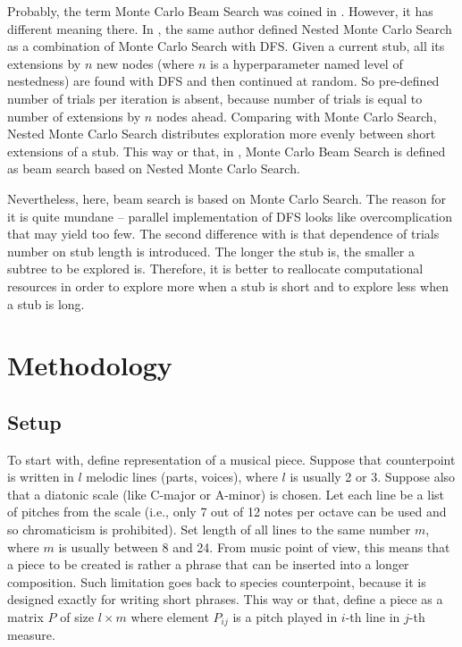 \documentclass{article}
\begin{document}
Probably, the term Monte Carlo Beam Search was coined in \cite{cazenave2012beam}. However, it has different meaning there. In \cite{cazenave2009nested}, the same author defined Nested Monte Carlo Search as a combination of Monte Carlo Search with DFS. Given a current stub, all its extensions by $n$ new nodes (where $n$ is a hyperparameter named level of nestedness) are found with DFS and then continued at random. So pre-defined number of trials per iteration is absent, because number of trials is equal to number of extensions by $n$ nodes ahead. Comparing with Monte Carlo Search, Nested Monte Carlo Search distributes exploration more evenly between short extensions of a stub. This way or that, in \cite{cazenave2012beam}, Monte Carlo Beam Search is defined as beam search based on Nested Monte Carlo Search.

Nevertheless, here, beam search is based on Monte Carlo Search. The reason for it is quite mundane -- parallel implementation of DFS looks like overcomplication that may yield too few. The second difference with \cite{cazenave2012beam} is that dependence of trials number on stub length is introduced. The longer the stub is, the smaller a subtree to be explored is. Therefore, it is better to reallocate computational resources in order to explore more when a stub is short and to explore less when a stub is long.

\section{Methodology}
\label{sec:methodology}

\subsection{Setup}
\label{subsec:setup}

To start with, define representation of a musical piece. Suppose that counterpoint is written in $l$ melodic lines (parts, voices), where $l$ is usually 2 or 3. Suppose also that a diatonic scale (like C-major or A-minor) is chosen. Let each line be a list of pitches from the scale (i.e., only 7 out of 12 notes per octave can be used and so chromaticism is prohibited). Set length of all lines to the same number $m$, where $m$ is usually between 8 and 24. From music point of view, this means that a piece to be created is rather a phrase that can be inserted into a longer composition. Such limitation goes back to species counterpoint, because it is designed exactly for writing short phrases. This way or that, define a piece as a matrix $P$ of size $l \times m$ where element $P_{ij}$ is a pitch played in $i$-th line in $j$-th measure.
\end{document}
